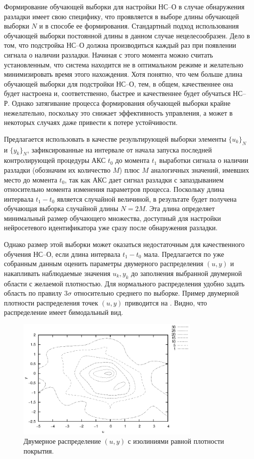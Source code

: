 Формирование обучающей выборки для настройки НС--О в случае обнаружения
разладки имеет свою специфику, что проявляется в выборе длины
обучающей выборки $N$ и в способе ее формирования. Стандартный подход
использования обучающей выборки постоянной длины в данном случае
нецелесообразен.  Дело в том, что подстройка НС--О должна производиться
каждый раз при появлении сигнала о наличии разладки.  Начиная с этого
момента можно считать установленным, что система находится не в
оптимальном режиме и желательно минимизировать время этого нахождения.
Хотя понятно, что чем больше длина обучающей выборки для подстройки
НС--О, тем, в общем, качественнее она будет настроена и,
соответственно, быстрее и качественнее будет обучаться НС--Р.  Однако
затягивание процесса формирования обучающей выборки крайне
нежелательно, поскольку это снижает эффективность управления, а может
в некоторых случаях даже привести к потере устойчивости.

Предлагается использовать в качестве результирующей выборки элементы
$\{u_k\}_N$ и $\{y_k\}_N$, зафиксированные на интервале от начала
запуска последней контролирующей процедуры АКС $t_0$ до момента $t_1$
выработки сигнала о наличии разладки (обозначим их количество $M$)
плюс $M$ аналогичных значений, имевших место до момента $t_0$, так как
АКС дает сигнал разладки с запаздыванием относительно момента
изменения параметров процесса.  Поскольку длина интервала $t_1-t_0$
является случайной величиной, в результате будет получена обучающая
выборка случайной длины $N=2M$.  Эта длина определяет минимальный
размер обучающего множества, доступный для настройки нейросетевого
идентификатора уже сразу после обнаружения разладки.

Однако размер этой выборки может оказаться недостаточным для
качественного обучения НС--О, если длина интервала $t_1-t_0$ мала.
Предлагается по уже собранным данным оценить параметры двумерного
распределения $(u,y)$ и накапливать наблюдаемые значения $u_k,y_k$ до
заполнения выбранной двумерной области с желаемой плотностью.  Для
нормального распределения удобно задать область по правилу $3\sigma$
относительно среднего по выборке.  Пример двумерной плотности
распределения точек $(u,y)$ приводится на
.  Видно, что распределение имеет
бимодальный вид.

\begin{figure}[h]
\centering
\includegraphics[width=0.8\textwidth,%
  totalheight=0.4\textheight]{u_ny_d2d_ru}
\caption{Двумерное распределение $(u,y)$ с изолиниями равной плотности
  покрытия.}
\label{fig:u_ny_d2d_ru}
\end{figure}

